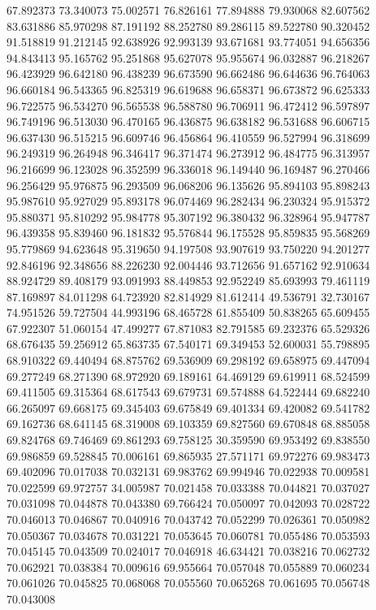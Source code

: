 67.892373
73.340073
75.002571
76.826161
77.894888
79.930068
82.607562
83.631886
85.970298
87.191192
88.252780
89.286115
89.522780
90.320452
91.518819
91.212145
92.638926
92.993139
93.671681
93.774051
94.656356
94.843413
95.165762
95.251868
95.627078
95.955674
96.032887
96.218267
96.423929
96.642180
96.438239
96.673590
96.662486
96.644636
96.764063
96.660184
96.543365
96.825319
96.619688
96.658371
96.673872
96.625333
96.722575
96.534270
96.565538
96.588780
96.706911
96.472412
96.597897
96.749196
96.513030
96.470165
96.436875
96.638182
96.531688
96.606715
96.637430
96.515215
96.609746
96.456864
96.410559
96.527994
96.318699
96.249319
96.264948
96.346417
96.371474
96.273912
96.484775
96.313957
96.216699
96.123028
96.352599
96.336018
96.149440
96.169487
96.270466
96.256429
95.976875
96.293509
96.068206
96.135626
95.894103
95.898243
95.987610
95.927029
95.893178
96.074469
96.282434
96.230324
95.915372
95.880371
95.810292
95.984778
95.307192
96.380432
96.328964
95.947787
96.439358
95.839460
96.181832
95.576844
96.175528
95.859835
95.568269
95.779869
94.623648
95.319650
94.197508
93.907619
93.750220
94.201277
92.846196
92.348656
88.226230
92.004446
93.712656
91.657162
92.910634
88.924729
89.408179
93.091993
88.449853
92.952249
85.693993
79.461119
87.169897
84.011298
64.723920
82.814929
81.612414
49.536791
32.730167
74.951526
59.727504
44.993196
68.465728
61.855409
50.838265
65.609455
67.922307
51.060154
47.499277
67.871083
82.791585
69.232376
65.529326
68.676435
59.256912
65.863735
67.540171
69.349453
52.600031
55.798895
68.910322
69.440494
68.875762
69.536909
69.298192
69.658975
69.447094
69.277249
68.271390
68.972920
69.189161
64.469129
69.619911
68.524599
69.411505
69.315364
68.617543
69.679731
69.574888
64.522444
69.682240
66.265097
69.668175
69.345403
69.675849
69.401334
69.420082
69.541782
69.162736
68.641145
68.319008
69.103359
69.827560
69.670848
68.885058
69.824768
69.746469
69.861293
69.758125
30.359590
69.953492
69.838550
69.986859
69.528845
70.006161
69.865935
27.571171
69.972276
69.983473
69.402096
70.017038
70.032131
69.983762
69.994946
70.022938
70.009581
70.022599
69.972757
34.005987
70.021458
70.033388
70.044821
70.037027
70.031098
70.044878
70.043380
69.766424
70.050097
70.042093
70.028722
70.046013
70.046867
70.040916
70.043742
70.052299
70.026361
70.050982
70.050367
70.034678
70.031221
70.053645
70.060781
70.055486
70.053593
70.045145
70.043509
70.024017
70.046918
46.634421
70.038216
70.062732
70.062921
70.038384
70.009616
69.955664
70.057048
70.055889
70.060234
70.061026
70.045825
70.068068
70.055560
70.065268
70.061695
70.056748
70.043008
